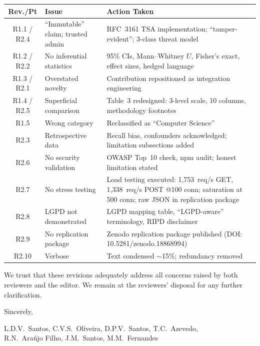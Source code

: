\documentclass[11pt,a4paper]{article}
\begin{document}
\begin{table}[h]
\centering
\small
\begin{tabular}{|c|p{5cm}|p{7cm}|}
\hline
\textbf{Rev./Pt} & \textbf{Issue} & \textbf{Action Taken} \\
\hline
R1.1 / R2.4 & ``Immutable'' claim; trusted admin & RFC~3161 TSA implementation; ``tamper-evident''; 3-class threat model \\
\hline
R1.2 / R2.2 & No inferential statistics & 95\% CIs, Mann--Whitney $U$, Fisher's exact, effect sizes, hedged language \\
\hline
R1.3 / R2.1 & Overstated novelty & Contribution repositioned as integration engineering \\
\hline
R1.4 / R2.5 & Superficial comparison & Table~3 redesigned: 3-level scale, 10 columns, methodology footnotes \\
\hline
R1.5 & Wrong category & Reclassified as ``Computer Science'' \\
\hline
R2.3 & Retrospective data & Recall bias, confounders acknowledged; limitation subsections added \\
\hline
R2.6 & No security validation & OWASP Top~10 check, npm audit; honest limitation stated \\
\hline
R2.7 & No stress testing & Load testing executed: 1,753~req/s GET, 1,338~req/s POST @100 conn; saturation at 500 conn; raw JSON in replication package \\
\hline
R2.8 & LGPD not demonstrated & LGPD mapping table, ``LGPD-aware'' terminology, RIPD disclaimer \\
\hline
R2.9 & No replication package & Zenodo replication package published (DOI: 10.5281/zenodo.18868994) \\
\hline
R2.10 & Verbose & Text condensed $\sim$15\%; redundancy removed \\
\hline
\end{tabular}
\end{table}

\bigskip

\noindent We trust that these revisions adequately address all concerns raised by both reviewers and the editor. We remain at the reviewers' disposal for any further clarification.

\bigskip
\noindent Sincerely,

\medskip
\noindent L.D.V.~Santos, C.V.S.~Oliveira, D.P.V.~Santos, T.C.~Azevedo,\\
R.N.~Araújo Filho, J.M.~Santos, M.M.~Fernandes
\end{document}
